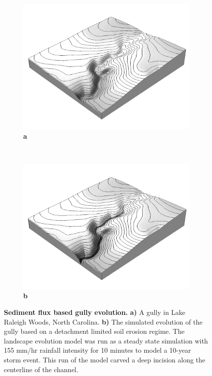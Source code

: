 \documentclass[10pt,letterpaper]{article}
\begin{document}
\begin{figure}
\centering
%   
\begin{subfigure}[b]{0.4\textwidth}
\includegraphics[width=\textwidth]{images/dem.png}
\label{fig_2_1}
\textbf{a} \\
\end{subfigure}
%
~ %
%
\begin{subfigure}[b]{0.4\textwidth}
\includegraphics[width=\textwidth]{images/evolved_dem.png}
\label{fig_2_2}
\textbf{b} \\
\end{subfigure}
%
\caption{{\bf Sediment flux based gully evolution.}
\textbf{a)}
A gully in Lake Raleigh Woods, North Carolina.
\textbf{b)}
The simulated evolution of the gully based on a detachment limited soil erosion regime. 
The landscape evolution model was run as a steady state simulation with 155 mm/hr rainfall intensity for 10 minutes to model a 10-year storm event. 
This run of the model carved a deep incision along the centerline of the channel.
}
\label{fig_2}
\end{figure}
\end{document}
